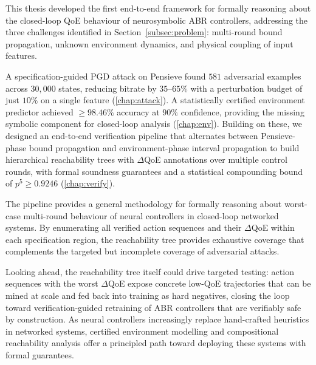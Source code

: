 \documentclass[thesis]{uofithesis} %
\begin{document}
    This thesis developed the first end-to-end framework for formally
    reasoning about the closed-loop QoE behaviour of neurosymbolic ABR
    controllers, addressing the three challenges identified in
    Section~\ref{subsec:problem}: multi-round bound propagation,
    unknown environment dynamics, and physical coupling of input
    features.

    A specification-guided PGD attack on Pensieve found $581$
    adversarial examples across $30{,}000$ states, reducing bitrate by
    $35$--$65\%$ with a perturbation budget of just $10\%$ on a single
    feature (\ref{chap:attack}).  A statistically certified
    environment predictor achieved $\geq 98.46\%$ accuracy at $90\%$
    confidence, providing the missing symbolic component for
    closed-loop analysis (\ref{chap:env}).  Building on these, we
    designed an end-to-end verification pipeline that alternates
    between Pensieve-phase bound propagation and environment-phase
    interval propagation to build hierarchical reachability trees with
    $\Delta$QoE annotations over multiple control rounds, with formal
    soundness guarantees and a statistical compounding bound of
    $p^5 \geq 0.9246$ (\ref{chap:verify}).

    The pipeline provides a general methodology for formally reasoning
    about worst-case multi-round behaviour of neural controllers in
    closed-loop networked systems.  By enumerating all verified action
    sequences and their $\Delta$QoE within each specification region,
    the reachability tree provides exhaustive coverage that complements
    the targeted but incomplete coverage of adversarial attacks.
    
    Looking ahead, the reachability tree itself could drive targeted
    testing: action sequences with the worst $\Delta$QoE expose
    concrete low-QoE trajectories that can be mined at scale and fed
    back into training as hard negatives, closing the loop toward
    verification-guided retraining of ABR controllers that are
    verifiably safe by construction. As neural controllers
    increasingly replace hand-crafted heuristics in networked systems,
    certified environment modelling and compositional reachability
    analysis offer a principled path toward deploying these systems
    with formal guarantees.


\printbibliography[heading=bibintoc,title={References}]
\end{document}
